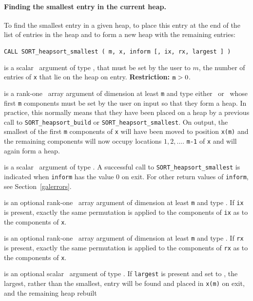 \documentclass{galahad}
\newcommand{\packagename}{SORT}
\begin{document}

\paragraph{Finding the smallest entry in the current heap.}

To find the smallest entry in a given heap,
to place this entry at the end of the list of entries in the heap and
to form a new heap with the remaining entries:

\hspace{8mm}
{\tt CALL \packagename\_heapsort\_smallest ( m, x, inform [, ix, rx, largest ] )}

\vspace*{-3mm}
\begin{description}
 is a scalar \intentin\ argument of type
\integer, that must be set by the user to $m$, the
number of entries of {\tt x} that lie on the heap on entry.
{\bf Restriction:} ${\tt m} > 0$.

 is a rank-one \intentinout\ array argument of
dimension at least {\tt m} and type either
\integer\ or \realdp\, whose first {\tt m} components must be set by
the user on input so that they form a heap.
In practice, this normally means that they have been placed on a heap
by a previous call to
{\tt \packagename\_heapsort\_build}
or
{\tt \packagename\_heapsort\_smallest}.
On output, the smallest of the first {\tt m} components of {\tt x} will have
been moved to position {\tt x(m)} and the remaining components will now occupy
locations $1,  2,  .... $ {\tt m-1} of {\tt x} and will again form a heap.

 is a scalar \intentout\ argument of type \integer.
A successful call to {\tt \packagename\_heapsort\_smallest}
is indicated when {\tt inform} has the value 0 on exit.
For other return values of {\tt inform}, see Section~\ref{galerrors}.

 is an optional rank-one \intentinout\ array argument of
dimension at least {\tt m} and type \integer.
If {\tt ix} is present, exactly the same permutation is applied to the
components of {\tt ix} as to the components of {\tt x}.

 is an optional rank-one \intentinout\ array argument of
dimension at least {\tt m} and type \realdp.
If {\tt rx} is present, exactly the same permutation is applied to the
components of {\tt rx} as to the components of {\tt x}.

 is an optional scalar \intentin\ argument
of type \logical.
If {\tt largest} is present and set to \true, the largest, rather than the
smallest, entry will be found and placed in {\tt x(m)} on exit, and
the remaining heap rebuilt

\end{description}
\end{document}
